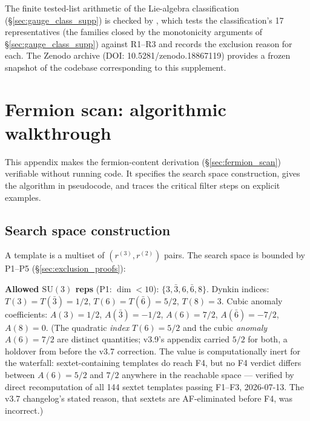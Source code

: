\documentclass[11pt]{article}
\theoremstyle{definition}
\newcommand{\SU}{\mathrm{SU}}
\newcommand{\codeid}[1]{\texttt{\seqsplit{#1}}}%
\begin{document}
The finite tested-list arithmetic of the Lie-algebra classification (\S\ref{sec:gauge_class_supp}) is checked by
\codeid{check\_L\_gauge\_template\_uniqueness}, which tests the
classification's 17 representatives (the families closed by the
monotonicity arguments of \S\ref{sec:gauge_class_supp}) against
R1--R3 and records the exclusion reason for each.  The Zenodo archive
(DOI: 10.5281/zenodo.18867119) provides a frozen snapshot of the
codebase corresponding to this supplement.




\section{Fermion scan: algorithmic walkthrough}
\label{app:scan_walkthrough}

This appendix makes the fermion-content derivation
(\S\ref{sec:fermion_scan}) verifiable without running code.  It
specifies the search space construction, gives the algorithm in
pseudocode, and traces the critical filter steps on explicit
examples.

\subsection{Search space construction}
\label{app:search_space}

A template is a multiset of $(r^{(3)}, r^{(2)})$ pairs.  The
search space is bounded by P1--P5 (\S\ref{sec:exclusion_proofs}):

\smallskip\noindent\textbf{Allowed $\SU(3)$ reps} (P1: $\dim < 10$):
$\{3, \bar{3}, 6, \bar{6}, 8\}$.
Dynkin indices: $T(3) = T(\bar{3}) = 1/2$, $T(6) = T(\bar{6}) = 5/2$,
$T(8) = 3$.  Cubic anomaly coefficients: $A(3) = 1/2$,
$A(\bar{3}) = -1/2$, $A(6) = 7/2$, $A(\bar{6}) = -7/2$, $A(8) = 0$.
(The quadratic \emph{index} $T(6) = 5/2$ and the cubic \emph{anomaly}
$A(6) = 7/2$ are distinct quantities; v3.9's appendix carried $5/2$
for both, a holdover from before the v3.7 correction.  The value is
computationally inert for the waterfall: sextet-containing templates
do reach F4, but no F4 verdict differs between $A(6) = 5/2$ and $7/2$
anywhere in the reachable space --- verified by direct recomputation
of all 144 sextet templates passing F1--F3, 2026-07-13.  The v3.7
changelog's stated reason, that sextets are AF-eliminated before F4,
was incorrect.)
\end{document}
